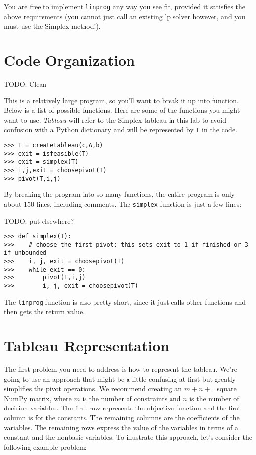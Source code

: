 You are free to implement {\tt linprog} any way you see fit, provided it satisfies the above requirements (you cannot just call an existing lp solver however, and you must use the Simplex method!).

\section*{Code Organization}
TODO: Clean

This is a relatively large program, so you'll want to break it up into function.
Below is a list of possible functions.
Here are some of the functions you might want to use.
\emph{Tableau} will refer to the Simplex tableau in this lab to avoid confusion with a Python dictionary and will be represented by {\tt T}  in the code.

\begin{lstlisting}
>>> T = createtableau(c,A,b)
>>> exit = isfeasible(T)
>>> exit = simplex(T)
>>> i,j,exit = choosepivot(T)
>>> pivot(T,i,j)
\end{lstlisting}

By breaking the program into so many functions, the entire program is only about 150 lines, including comments.
The {\tt simplex} function is just a few lines:

TODO: put elsewhere?

\begin{lstlisting}
>>> def simplex(T):
>>>    # choose the first pivot: this sets exit to 1 if finished or 3 if unbounded
>>>    i, j, exit = choosepivot(T)
>>>    while exit == 0:
>>>        pivot(T,i,j)
>>>        i, j, exit = choosepivot(T)
\end{lstlisting}
The {\tt linprog} function is also pretty short, since it just calls other functions and then gets the return value.

\section*{Tableau Representation}

The first problem you need to address is how to represent the tableau.
We're going to use an approach that might be a little confusing at first but greatly simplifies the pivot operations.
We recommend creating an $m + n + 1$ square NumPy matrix, where $m$ is the number of constraints and $n$ is the number of decision variables.
The first row represents the objective function and the first column is for the constants.
The remaining columns are the coefficients of the variables.
The remaining rows express the value of the variables in terms of a constant and the nonbasic variables.
To illustrate this approach, let's consider the following example problem:

